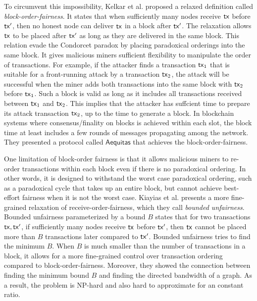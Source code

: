 To circumvent this impossibility, Kelkar et al. proposed a relaxed definition called \textit{block-order-fairness}. It states that when sufficiently many nodes receive $\mathsf{tx}$ before $\mathsf{tx}'$, then no honest node can deliver $\mathsf{tx}$ in a block after $\mathsf{tx}'$. The relaxation allows $\mathsf{tx}$ to be placed after $\mathsf{tx}'$ as long as they are delivered in the same block. This relation evade the Condorcet paradox by placing paradoxical orderings into the same block. It gives malicious miners sufficient flexibility to manipulate the order of transactions. For example, if the attacker finds a transaction $\mathsf{tx}_1$ that is suitable for a front-running attack by a transaction $\mathsf{tx}_2$, the attack will be successful when the miner adds both transactions into the same block with $\mathsf{tx}_2$ before $\mathsf{tx}_1$. Such a block is valid as long as it includes all transactions received between $\mathsf{tx}_1$ and $\mathsf{tx}_2$. This implies that the attacker has suffcient time to prepare its attack transaction $\mathsf{tx}_2$, up to the time to generate a block. In blockchain systems where consensus/finality on blocks is achieved within each slot, the block time at least includes a few rounds of messages propagating among the network.  They presented a protocol called $\mathsf{Aequitas}$ that achieves the block-order-fairness. 


One limitation of block-order fairness is that it allows malicious miners to re-order transactions within each block even if there is no paradoxical ordering. In other words, it is designed to withstand the worst case paradoxical ordering, such as a paradoxical cycle that takes up an entire block, but cannot achieve best-effort fairness when it is not the worst case. Kiayias et al. \cite{DBLP:conf/eurocrypt/KiayiasLS24} presents a more fine-grained relaxation of receive-order-fairness, which they call \textit{bounded unfairness}. Bounded unfairness parameterized by a bound $B$ states that for two transactions $\mathsf{tx},\mathsf{tx}'$, if sufficiently many nodes receive $\mathsf{tx}$ before $\mathsf{tx}'$, then $\mathsf{tx}$ cannot be placed more than $B$ transactions later compared to $\mathsf{tx}'$. Bounded unfairness tries to find the minimum $B$. When $B$ is much smaller than the number of transactions in a block, it allows for a more fine-grained control over transaction ordering compared to block-order-fairness. Moreover, they showed the connection between finding the minimum bound $B$ and finding the directed bandwidth of a graph. As a result, the problem is NP-hard and also hard to approximate for an constant ratio. 

